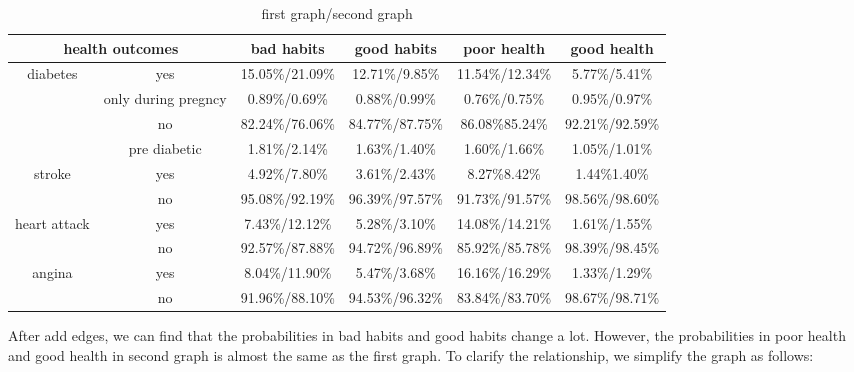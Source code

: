 \documentclass[aps,letterpaper,10pt]{revtex4}
\begin{document}
\begin{table}[h]
    \caption{first graph/second graph}
    \begin{tabular}{|c|c|c|c|c|c|}
        \hline
        \multicolumn{2}{|c|}{health outcomes}  & bad habits & good habits &poor health  &good health\\
        \hline
        \multirow{4}{*}{diabetes} &yes         & 15.05\%/21.09\%     & 12.71\%/9.85\%    &11.54\%/12.34\%      &5.77\%/5.41\%  \\
        \cline{2-6}                    &only during pregncy & 0.89\%/0.69\%     & 0.88\%/0.99\%      &0.76\%/0.75\%       &0.95\%/0.97\%\\
        \cline{2-6}                       &no                  & 82.24\%/76.06\%     & 84.77\%/87.75\%    &86.08\%85.24\%      &92.21\%/92.59\%\\
        \cline{2-6}                    &pre diabetic        & 1.81\%/2.14\%     & 1.63\%/1.40\%      &1.60\%/1.66\%       &1.05\%/1.01\%\\
        \hline
        \multirow{2}{*}{stroke}   &yes  & 4.92\%/7.80\%     & 3.61\%/2.43\%      &8.27\%8.42\%       & 1.44\%1.40\% \\
        \cline{2-6}                          &no   & 95.08\%/92.19\%    & 96.39\%/97.57\%      &91.73\%/91.57\%      & 98.56\%/98.60\%\\
        \hline
        \multirow{2}{*}{heart attack}   &yes        & 7.43\%/12.12\%     & 5.28\%/3.10\%       &14.08\%/14.21\%      & 1.61\%/1.55\%\\
        \cline{2-6}                     &no         & 92.57\%/87.88\%     & 94.72\%/96.89\%       &85.92\%/85.78\%      & 98.39\%/98.45\%\\
        \hline
        \multirow{2}{*}{angina}   &yes        & 8.04\%/11.90\%     & 5.47\%/3.68\%       &16.16\%/16.29\%      & 1.33\%/1.29\%\\
        \cline{2-6}               &no         & 91.96\%/88.10\%     & 94.53\%/96.32\%       &83.84\%/83.70\%      & 98.67\%/98.71\%\\
        \hline
    \end{tabular}
    \end{table}
After add edges, we can find that the probabilities in bad habits and good habits change a lot. However, the probabilities in poor health and good health in second graph is almost the same as 
the first graph. To clarify the relationship, we simplify the graph as follows:\\
\begin{center}
\end{center}
\end{document}
